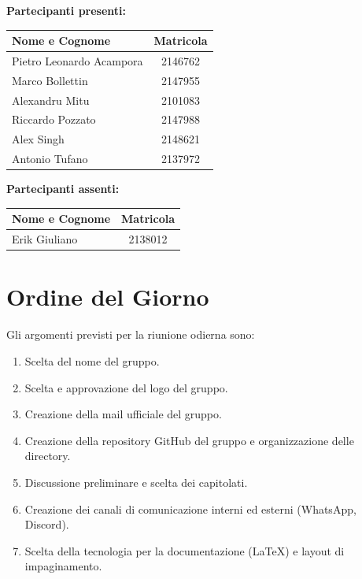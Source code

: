 \documentclass[a4paper, 11pt]{article}
\begin{document}
\vspace{0.5cm}
\textbf{Partecipanti presenti:} \\
\vspace{0.2cm}
\renewcommand{\arraystretch}{1.2}
\begin{tabularx}{0.8\textwidth}{|X|c|}
\hline
\textbf{Nome e Cognome} & \textbf{Matricola} \\ \hline
Pietro Leonardo Acampora & 2146762 \\ \hline
Marco Bollettin & 2147955 \\ \hline
Alexandru Mitu & 2101083 \\ \hline
Riccardo Pozzato & 2147988 \\ \hline
Alex Singh & 2148621 \\ \hline
Antonio Tufano & 2137972 \\ \hline
\end{tabularx}

\vspace{0.5cm}
\textbf{Partecipanti assenti:} \\
\vspace{0.2cm}
\renewcommand{\arraystretch}{1.2}
\begin{tabularx}{0.8\textwidth}{|X|c|}
\hline
\textbf{Nome e Cognome} & \textbf{Matricola} \\ \hline
Erik Giuliano & 2138012 \\ \hline
\end{tabularx}

\vspace{0.5cm}
\section{Ordine del Giorno}
Gli argomenti previsti per la riunione odierna sono:
\begin{enumerate}
    \item Scelta del nome del gruppo.
    \item Scelta e approvazione del logo del gruppo.
    \item Creazione della mail ufficiale del gruppo.
    \item Creazione  della repository GitHub del gruppo e organizzazione delle directory.
    \item Discussione preliminare e scelta dei capitolati.
    \item Creazione dei canali di comunicazione interni ed esterni (WhatsApp, Discord).
    \item Scelta della tecnologia per la documentazione (LaTeX) e layout di impaginamento.
\end{enumerate}
\end{document}
